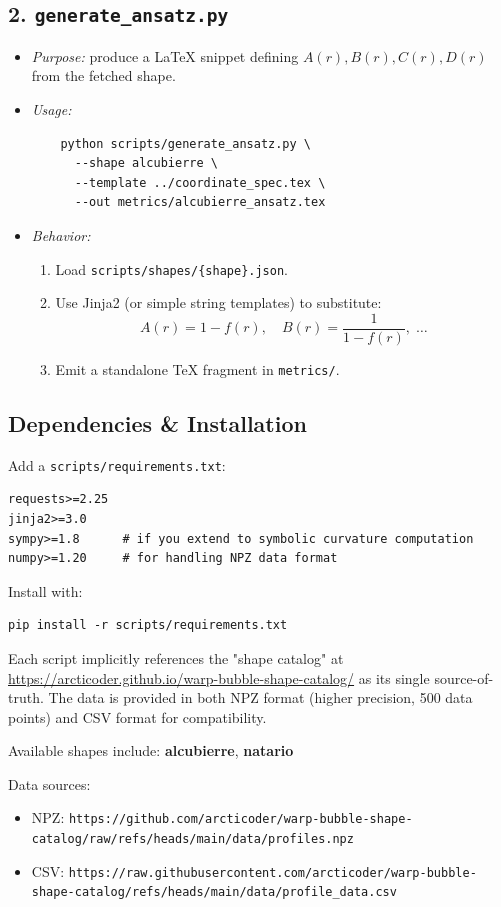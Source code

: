 \documentclass[11pt]{article}
\begin{document}
\subsection*{2. \texttt{generate_ansatz.py}}
\begin{itemize}
  \item \emph{Purpose:} produce a LaTeX snippet defining
    $A(r),B(r),C(r),D(r)$ from the fetched shape.
  \item \emph{Usage:}
    \begin{verbatim}
    python scripts/generate_ansatz.py \
      --shape alcubierre \
      --template ../coordinate_spec.tex \
      --out metrics/alcubierre_ansatz.tex
    \end{verbatim}
  \item \emph{Behavior:}
    \begin{enumerate}
      \item Load \verb|scripts/shapes/{shape}.json|.
      \item Use Jinja2 (or simple string templates) to substitute:
        \[
          A(r)=1 - f(r),\quad B(r)=\frac{1}{1 - f(r)},\;\dots
        \]
      \item Emit a standalone TeX fragment in \verb|metrics/|.
    \end{enumerate}
\end{itemize}

\subsection*{Dependencies \& Installation}
Add a \texttt{scripts/requirements.txt}:
\begin{verbatim}
requests>=2.25
jinja2>=3.0
sympy>=1.8      # if you extend to symbolic curvature computation
numpy>=1.20     # for handling NPZ data format
\end{verbatim}
Install with:
\begin{verbatim}
pip install -r scripts/requirements.txt
\end{verbatim}

\noindent
Each script implicitly references the "shape catalog" at  
\href{https://arcticoder.github.io/warp-bubble-shape-catalog/}{https://arcticoder.github.io/warp-bubble-shape-catalog/}  
as its single source-of-truth. The data is provided in both NPZ format (higher precision, 500 data points) and CSV format for compatibility.

Available shapes include: \textbf{alcubierre}, \textbf{natario}

Data sources:
\begin{itemize}
  \item NPZ: \verb|https://github.com/arcticoder/warp-bubble-shape-catalog/raw/refs/heads/main/data/profiles.npz|
  \item CSV: \verb|https://raw.githubusercontent.com/arcticoder/warp-bubble-shape-catalog/refs/heads/main/data/profile_data.csv|
\end{itemize}
\end{document}
